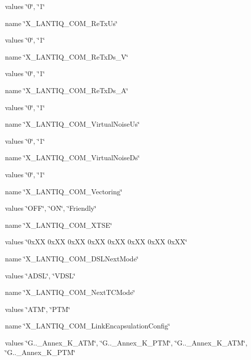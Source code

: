 \begin{DoxyItemize}
\item values \char`\"{}0\char`\"{}, \char`\"{}1\char`\"{}
\item name \char`\"{}\-X\-\_\-\-L\-A\-N\-T\-I\-Q\-\_\-\-C\-O\-M\-\_\-\-Re\-Tx\-Us\char`\"{}
\item values \char`\"{}0\char`\"{}, \char`\"{}1\char`\"{}
\item name \char`\"{}\-X\-\_\-\-L\-A\-N\-T\-I\-Q\-\_\-\-C\-O\-M\-\_\-\-Re\-Tx\-Ds\-\_\-\-V\char`\"{}
\item values \char`\"{}0\char`\"{}, \char`\"{}1\char`\"{}
\item name \char`\"{}\-X\-\_\-\-L\-A\-N\-T\-I\-Q\-\_\-\-C\-O\-M\-\_\-\-Re\-Tx\-Ds\-\_\-\-A\char`\"{}
\item values \char`\"{}0\char`\"{}, \char`\"{}1\char`\"{}
\item name \char`\"{}\-X\-\_\-\-L\-A\-N\-T\-I\-Q\-\_\-\-C\-O\-M\-\_\-\-Virtual\-Noise\-Us\char`\"{}
\item values \char`\"{}0\char`\"{}, \char`\"{}1\char`\"{}
\item name \char`\"{}\-X\-\_\-\-L\-A\-N\-T\-I\-Q\-\_\-\-C\-O\-M\-\_\-\-Virtual\-Noise\-Ds\char`\"{}
\item values \char`\"{}0\char`\"{}, \char`\"{}1\char`\"{}
\item name \char`\"{}\-X\-\_\-\-L\-A\-N\-T\-I\-Q\-\_\-\-C\-O\-M\-\_\-\-Vectoring\char`\"{}
\item values \char`\"{}\-O\-F\-F\char`\"{}, \char`\"{}\-O\-N\char`\"{}, \char`\"{}\-Friendly\char`\"{}
\item name \char`\"{}\-X\-\_\-\-L\-A\-N\-T\-I\-Q\-\_\-\-C\-O\-M\-\_\-\-X\-T\-S\-E\char`\"{}
\item values \char`\"{}0x\-X\-X 0x\-X\-X 0x\-X\-X 0x\-X\-X 0x\-X\-X 0x\-X\-X 0x\-X\-X 0x\-X\-X\char`\"{}
\item name \char`\"{}\-X\-\_\-\-L\-A\-N\-T\-I\-Q\-\_\-\-C\-O\-M\-\_\-\-D\-S\-L\-Next\-Mode\char`\"{}
\item values \char`\"{}\-A\-D\-S\-L\char`\"{}, \char`\"{}\-V\-D\-S\-L\char`\"{}
\item name \char`\"{}\-X\-\_\-\-L\-A\-N\-T\-I\-Q\-\_\-\-C\-O\-M\-\_\-\-Next\-T\-C\-Mode\char`\"{}
\item values \char`\"{}\-A\-T\-M\char`\"{}, \char`\"{}\-P\-T\-M\char`\"{}
\item name \char`\"{}\-X\-\_\-\-L\-A\-N\-T\-I\-Q\-\_\-\-C\-O\-M\-\_\-\-Link\-Encapsulation\-Config\char`\"{}
\item values \char`\"{}\-G..\-\_\-\-Annex\-\_\-\-K\-\_\-\-A\-T\-M\char`\"{}, \char`\"{}\-G..\-\_\-\-Annex\-\_\-\-K\-\_\-\-P\-T\-M\char`\"{}, \char`\"{}\-G..\-\_\-\-Annex\-\_\-\-K\-\_\-\-A\-T\-M\char`\"{}, \char`\"{}\-G..\-\_\-\-Annex\-\_\-\-K\-\_\-\-P\-T\-M\char`\"{}

\end{DoxyItemize}
